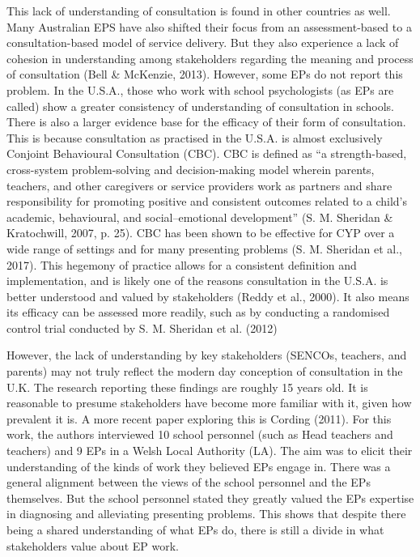 \documentclass[
  english,
  man]{apa7}
\begin{document}
This lack of understanding of consultation is found in other countries as well. Many Australian EPS have also shifted their focus from an assessment-based to a consultation-based model of service delivery. But they also experience a lack of cohesion in understanding among stakeholders regarding the meaning and process of consultation (Bell \& McKenzie, 2013). However, some EPs do not report this problem. In the U.S.A., those who work with school psychologists (as EPs are called) show a greater consistency of understanding of consultation in schools. There is also a larger evidence base for the efficacy of their form of consultation. This is because consultation as practised in the U.S.A. is almost exclusively Conjoint Behavioural Consultation (CBC). CBC is defined as ``a strength-based, cross-system problem-solving and decision-making model wherein parents, teachers, and other caregivers or service providers work as partners and share responsibility for promoting positive and consistent outcomes related to a child's academic, behavioural, and social--emotional development'' (S. M. Sheridan \& Kratochwill, 2007, p. 25). CBC has been shown to be effective for CYP over a wide range of settings and for many presenting problems (S. M. Sheridan et al., 2017). This hegemony of practice allows for a consistent definition and implementation, and is likely one of the reasons consultation in the U.S.A. is better understood and valued by stakeholders (Reddy et al., 2000). It also means its efficacy can be assessed more readily, such as by conducting a randomised control trial conducted by S. M. Sheridan et al. (2012)

However, the lack of understanding by key stakeholders (SENCOs, teachers, and parents) may not truly reflect the modern day conception of consultation in the U.K. The research reporting these findings are roughly 15 years old. It is reasonable to presume stakeholders have become more familiar with it, given how prevalent it is. A more recent paper exploring this is Cording (2011). For this work, the authors interviewed 10 school personnel (such as Head teachers and teachers) and 9 EPs in a Welsh Local Authority (LA). The aim was to elicit their understanding of the kinds of work they believed EPs engage in. There was a general alignment between the views of the school personnel and the EPs themselves. But the school personnel stated they greatly valued the EPs expertise in diagnosing and alleviating presenting problems. This shows that despite there being a shared understanding of what EPs do, there is still a divide in what stakeholders value about EP work.
\end{document}
